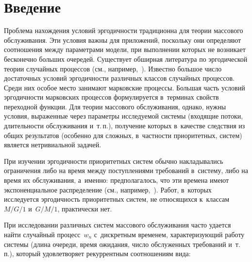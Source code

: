 
  



\thispagestyle{headings}

\begin{multicols}{2}

\label{st\stat}

\section{Введение} 

Проблема нахождения условий эргодичности традиционна
для тео\-рии массового обслуживания.
Эти условия важны для приложений, поскольку они определяют
соотношения между параметрами модели, при выполнении которых не
возникает бесконечно больших очередей. Существует обширная
литература по эргодической тео\-рии случайных процессов (см.,
например,~\cite{key-1,key-2}). Известно большое чис\-ло достаточных
условий эр\-го\-дич\-ности различных классов случайных процессов. Среди
них особое мес\-то занимают марковские процессы. Большая часть
условий эр\-го\-дич\-ности марковских процессов формулируется в~терминах
свойств переходной функции. Для теории массового обслуживания,
однако, нуж\-ны условия, выраженные через па\-ра\-мет\-ры ис\-сле\-ду\-емой
сис\-те\-мы (входящие потоки, длительности обслуживания и~т.\,п.),
получение которых в~качестве следствия из общих результатов
(особенно для слож\-ных, в~част\-ности приоритетных, сис\-тем) является
нетривиальной задачей.

При изучении эргодичности приоритетных сис\-тем обычно накладывались
ограничения либо на время меж\-ду поступлениями требований в~сис\-те\-му,
либо на время их обслу\-жи\-ва\-ния, а~именно: предполагалось, что эти
времена имеют экспоненциальное распределение (см., например,~\cite{key-3}). 
Работ, в~которых исследуется эр\-го\-дич\-ность
приоритетных сис\-тем, не относящихся к~классам $M/G/1$ и~$G/M/1$,
практически нет.

При исследовании различных сис\-тем массового обслуживания час\-то
удается найти случайный процесс~$w_{n}$ с~дискретным временем,
характеризующий работу сис\-те\-мы (длина очереди, время ожидания,
чис\-ло обслуженных требований и~т.\,п.), который удовле\-тво\-ря\-ет
рекуррентным соотношениям вида:


\end{multicols}
